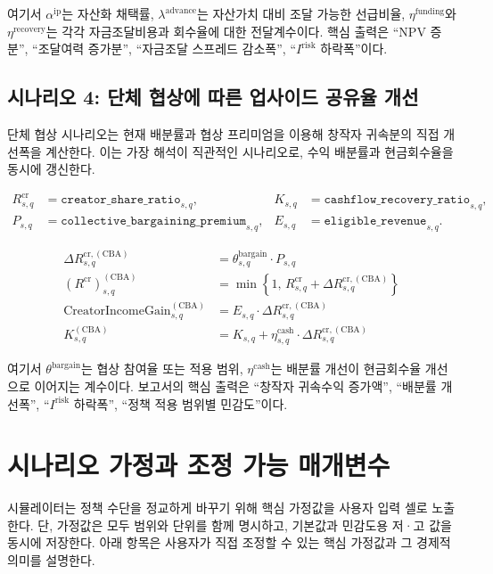 \documentclass[11pt,a4paper]{report}
\begin{document}
여기서 $\alpha^{\mathrm{ip}}$는 자산화 채택률, $\lambda^{\mathrm{advance}}$는 자산가치 대비 조달 가능한 선급비율, $\eta^{\mathrm{funding}}$와 $\eta^{\mathrm{recovery}}$는 각각 자금조달비용과 회수율에 대한 전달계수이다. 핵심 출력은 ``NPV 증분'', ``조달여력 증가분'', ``자금조달 스프레드 감소폭'', ``$I^{\mathrm{risk}}$ 하락폭''이다.

\subsection{시나리오 4: 단체 협상에 따른 업사이드 공유율 개선}
단체 협상 시나리오는 현재 배분률과 협상 프리미엄을 이용해 창작자 귀속분의 직접 개선폭을 계산한다. 이는 가장 해석이 직관적인 시나리오로, 수익 배분률과 현금회수율을 동시에 갱신한다.

\[
\begin{aligned}
R^{\mathrm{cr}}_{s,q} &= \texttt{creator\_share\_ratio}_{s,q}, &
K_{s,q} &= \texttt{cashflow\_recovery\_ratio}_{s,q}, \\
P_{s,q} &= \texttt{collective\_bargaining\_premium}_{s,q}, &
E_{s,q} &= \texttt{eligible\_revenue}_{s,q}.
\end{aligned}
\]

\begin{align}
\Delta R^{\mathrm{cr},(\mathrm{CBA})}_{s,q} &= \theta^{\mathrm{bargain}}_{s,q}\cdot P_{s,q} \\
\left(R^{\mathrm{cr}}\right)^{(\mathrm{CBA})}_{s,q} &= \min\!\left\{1,\,
R^{\mathrm{cr}}_{s,q} + \Delta R^{\mathrm{cr},(\mathrm{CBA})}_{s,q}\right\} \\
\mathrm{CreatorIncomeGain}^{(\mathrm{CBA})}_{s,q} &= E_{s,q}\cdot \Delta R^{\mathrm{cr},(\mathrm{CBA})}_{s,q} \\
K^{(\mathrm{CBA})}_{s,q} &= K_{s,q} + \eta^{\mathrm{cash}}_{s,q}\cdot \Delta R^{\mathrm{cr},(\mathrm{CBA})}_{s,q}
\end{align}

여기서 $\theta^{\mathrm{bargain}}$는 협상 참여율 또는 적용 범위, $\eta^{\mathrm{cash}}$는 배분률 개선이 현금회수율 개선으로 이어지는 계수이다. 보고서의 핵심 출력은 ``창작자 귀속수익 증가액'', ``배분률 개선폭'', ``$I^{\mathrm{risk}}$ 하락폭'', ``정책 적용 범위별 민감도''이다.

\section{시나리오 가정과 조정 가능 매개변수}
시뮬레이터는 정책 수단을 정교하게 바꾸기 위해 핵심 가정값을 사용자 입력 셀로 노출한다. 단, 가정값은 모두 범위와 단위를 함께 명시하고, 기본값과 민감도용 저·고 값을 동시에 저장한다.
아래 항목은 사용자가 직접 조정할 수 있는 핵심 가정값과 그 경제적 의미를 설명한다.
\end{document}
